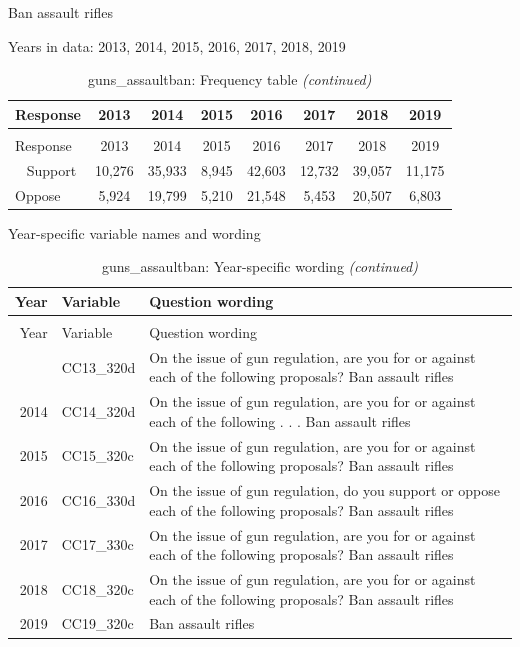\documentclass[12pt]{article}
\begin{document}
Ban assault rifles

Years in data: 2013, 2014, 2015, 2016, 2017, 2018,
2019\begingroup\fontsize{10}{12}\selectfont

\begin{longtable}[t]{lccccccc}
\caption{\label{tab:unnamed-chunk-4}guns\_assaultban: Frequency table}\\
\toprule
Response & 2013 & 2014 & 2015 & 2016 & 2017 & 2018 & 2019\\
\midrule
\endfirsthead
\caption[]{guns\_assaultban: Frequency table \textit{(continued)}}\\
\toprule
Response & 2013 & 2014 & 2015 & 2016 & 2017 & 2018 & 2019\\
\midrule
\endhead
\
\endfoot
\bottomrule
\endlastfoot
Support & 10,276 & 35,933 & 8,945 & 42,603 & 12,732 & 39,057 & 11,175\\
Oppose & 5,924 & 19,799 & 5,210 & 21,548 & 5,453 & 20,507 & 6,803\\*
\end{longtable}

\endgroup{}

Year-specific variable names and wording

\begin{longtable}[t]{rl>{\raggedright\arraybackslash}p{10cm}}
\caption{\label{tab:unnamed-chunk-4}guns\_assaultban: Year-specific wording}\\
\toprule
Year & Variable & Question wording\\
\midrule
\endfirsthead
\caption[]{guns\_assaultban: Year-specific wording \textit{(continued)}}\\
\toprule
Year & Variable & Question wording\\
\midrule
\endhead
\
\endfoot
\bottomrule
\endlastfoot
2013 & CC13\_320d & On the issue of gun regulation, are you for or against each of the following proposals? Ban assault rifles\\
2014 & CC14\_320d & On the issue of gun regulation, are you for or against each of the following . . . Ban assault rifles\\
2015 & CC15\_320c & On the issue of gun regulation, are you for or against each of the following proposals? Ban assault rifles\\
2016 & CC16\_330d & On the issue of gun regulation, do you support or oppose each of the following proposals? Ban assault rifles\\
2017 & CC17\_330c & On the issue of gun regulation, are you for or against each of the following proposals? Ban assault rifles\\
2018 & CC18\_320c & On the issue of gun regulation, are you for or against each of the following proposals? Ban assault rifles\\
2019 & CC19\_320c & Ban assault rifles\\*
\end{longtable}
\end{document}
